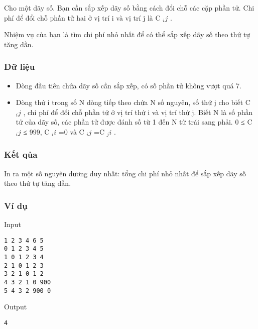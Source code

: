 

Cho một dãy số. Bạn cần sắp xếp dãy số bằng cách đổi chỗ các cặp phần tử. Chi phí để đổi chỗ phần tử hai ở vị trí i và vị trí j là C $_ ij $ .

Nhiệm vụ của bạn là tìm chi phí nhỏ nhất để có thể sắp xếp dãy số theo thứ tự tăng dần.

\subsubsection{Dữ liệu}
\begin{itemize}
	\item Dòng đầu tiên chứa dãy số cần sắp xếp, có số phần tử không vượt quá 7.
	\item Dòng thứ i trong số N dòng tiếp theo chứa N số nguyên, số thứ j cho biết C $_ ij $ , chi phí để đổi chỗ phần tử ở vị trí thứ i và vị trí thứ j. Biết N là số phần tử của dãy số, các phần tử được đánh số từ 1 đến N từ trái sang phải. 0 ≤ C $_ ij $ ≤ 999, C $_ ii $ =0 và C $_ ij $ =C $_ ji $ .
\end{itemize}

\subsubsection{Kết qủa}

In ra một số nguyên dương duy nhất: tổng chi phí nhỏ nhất để sắp xếp dãy số theo thứ tự tăng dần.

\subsubsection{Ví dụ}

Input
\begin{verbatim}
1 2 3 4 6 5
0 1 2 3 4 5
1 0 1 2 3 4
2 1 0 1 2 3
3 2 1 0 1 2
4 3 2 1 0 900
5 4 3 2 900 0\end{verbatim}

Output
\begin{verbatim}
4\end{verbatim}